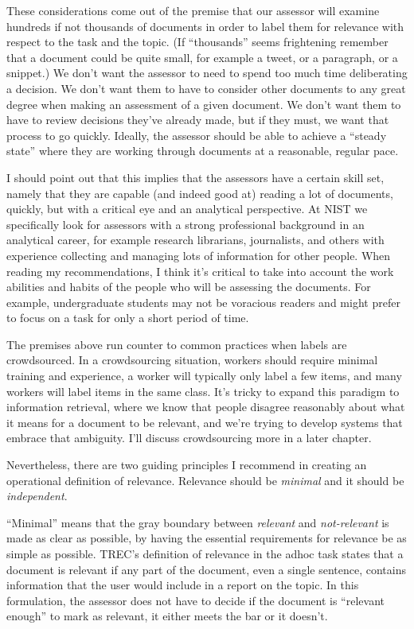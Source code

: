 \documentclass[nobib]{tufte-book}
\begin{document}
These considerations come out of the premise that our assessor will examine hundreds if not thousands of documents in order to label them for relevance with respect to the task and the topic.  (If ``thousands'' seems frightening remember that a document could be quite small, for example a tweet, or a paragraph, or a snippet.)  We don't want the assessor to need to spend too much time deliberating a decision.  We don't want them to have to consider other documents to any great degree when making an assessment of a given document.  We don't want them to have to review decisions they've already made, but if they must, we want that process to go quickly.  Ideally, the assessor should be able to achieve a ``steady state'' where they are working through documents at a reasonable, regular pace.

I should point out that this implies that the assessors have a certain skill set, namely that they are capable (and indeed good at) reading a lot of documents, quickly, but with a critical eye and an analytical perspective.  At NIST we specifically look for assessors with a strong professional background in an analytical career, for example research librarians, journalists, and others with experience collecting and managing lots of information for other people.  When reading my recommendations, I think it's critical to take into account the work abilities and habits of the people who will be assessing the documents.  For example, undergraduate students may not be voracious readers and might prefer to focus on a task for only a short period of time.

The premises above run counter to common practices when labels are crowdsourced. In a crowdsourcing situation, workers should require minimal training and experience, a worker will typically only label a few items, and many workers will label items in the same class.  It's tricky to expand this paradigm to information retrieval, where we know that people disagree reasonably about what it means for a document to be relevant, and we're trying to develop systems that embrace that ambiguity.  I'll discuss crowdsourcing more in a later chapter.

Nevertheless, there are two guiding principles I recommend in creating an operational definition of relevance.  Relevance should be {\em minimal} and it should be {\em independent}.

``Minimal'' means that the gray boundary between {\em relevant} and {\em not-relevant} is made as clear as possible, by having the essential requirements for relevance be as simple as possible.  TREC's definition of relevance in the adhoc task states that a document is relevant if any part of the document, even a single sentence, contains information that the user would include in a report on the topic.\autocite[chapter 2]{voorhees_trec:_2005}  In this formulation, the assessor does not have to decide if the document is ``relevant enough'' to mark as relevant, it either meets the bar or it doesn't.
\end{document}

